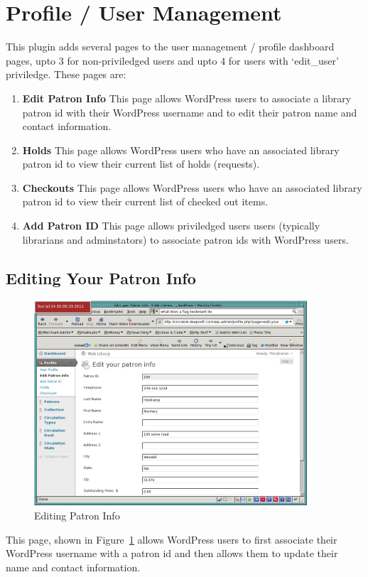 \documentclass[letterpaper,twoside]{article}
\begin{document}
\section{Profile / User Management}

This plugin adds several pages to the user management / profile
dashboard pages, upto 3 for non-priviledged users and upto 4 for users
with `edit\_user' priviledge.  These pages are:
\begin{enumerate}
\item \textbf{Edit Patron Info} This page allows WordPress users to associate a
library patron id with their WordPress username and to edit their
patron name and contact information.
\item \textbf{Holds} This page allows WordPress users who have an
associated library patron id to view their current list of holds
(requests).
\item \textbf{Checkouts} This page allows WordPress users who have an
associated library patron id to view their current list of checked out
items.
\item \textbf{Add Patron ID} This page allows priviledged users users
(typically librarians and adminstators) to associate patron ids with
WordPress users.
\end{enumerate}

\subsection{Editing Your Patron Info}

\begin{figure}[htbp]
\begin{centering}
\includegraphics[width=4in]{EditPatronInfo.png}
\caption{Editing Patron Info}
\label{fig:EditPatronInfo}
\end{centering}
\end{figure}
This page, shown in Figure~\ref{fig:EditPatronInfo} allows WordPress
users to first associate their WordPress username with a patron id and
then allows them to update their name and contact information.
\end{document}
